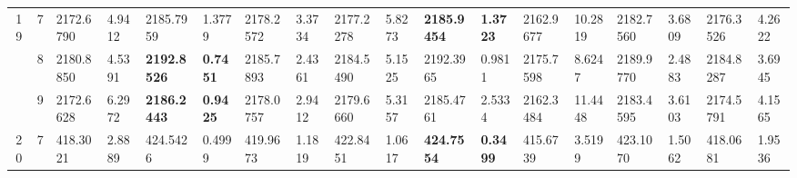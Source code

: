 \documentclass[conference]{IEEEtran}
\begin{document}
\begin{table*}[]
\begin{tabular}{|cc|ll|ll|ll|ll|ll|ll|ll|ll|}
		\multicolumn{1}{|c|}{\multirow{3}{*}{19}}         & 7                               & \multicolumn{1}{l|}{2172.6790}         & 4.9412                            & \multicolumn{1}{l|}{2185.7959}          & 1.3779                            & \multicolumn{1}{l|}{2178.2572}         & 3.3734                            & \multicolumn{1}{l|}{2177.2278}         & 5.8273                            & \multicolumn{1}{l|}{\textbf{2185.9454}} & \textbf{1.3723}                   & \multicolumn{1}{l|}{2162.9677}         & 10.2819                           & \multicolumn{1}{l|}{2182.7560}         & 3.6809                            & \multicolumn{1}{l|}{2176.3526}         & 4.2622                            \\ \cline{2-18} 
		\multicolumn{1}{|c|}{}                            & 8                               & \multicolumn{1}{l|}{2180.8850}         & 4.5391                            & \multicolumn{1}{l|}{\textbf{2192.8526}} & \textbf{0.7451}                   & \multicolumn{1}{l|}{2185.7893}         & 2.4361                            & \multicolumn{1}{l|}{2184.5490}         & 5.1525                            & \multicolumn{1}{l|}{2192.3965}          & 0.9811                            & \multicolumn{1}{l|}{2175.7598}         & 8.6247                            & \multicolumn{1}{l|}{2189.9770}         & 2.4883                            & \multicolumn{1}{l|}{2184.8287}         & 3.6945                            \\ \cline{2-18} 
		\multicolumn{1}{|c|}{}                            & 9                               & \multicolumn{1}{l|}{2172.6628}         & 6.2972                            & \multicolumn{1}{l|}{\textbf{2186.2443}} & \textbf{0.9425}                   & \multicolumn{1}{l|}{2178.0757}         & 2.9412                            & \multicolumn{1}{l|}{2179.6660}         & 5.3157                            & \multicolumn{1}{l|}{2185.4761}          & 2.5334                            & \multicolumn{1}{l|}{2162.3484}         & 11.4448                           & \multicolumn{1}{l|}{2183.4595}         & 3.6103                            & \multicolumn{1}{l|}{2174.5791}         & 4.1565                            \\ \hline
		\multicolumn{1}{|c|}{\multirow{3}{*}{20}}         & 7                               & \multicolumn{1}{l|}{418.3021}          & 2.8889                            & \multicolumn{1}{l|}{424.5426}           & 0.4999                            & \multicolumn{1}{l|}{419.9673}          & 1.1819                            & \multicolumn{1}{l|}{422.8451}          & 1.0617                            & \multicolumn{1}{l|}{\textbf{424.7554}}  & \textbf{0.3499}                   & \multicolumn{1}{l|}{415.6739}          & 3.5199                            & \multicolumn{1}{l|}{423.1070}          & 1.5062                            & \multicolumn{1}{l|}{418.0681}          & 1.9536                            \\ \cline{2-18} 

\end{tabular}
\end{table*}
\end{document}
